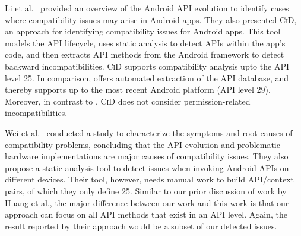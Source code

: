 Li et al.~\cite{lili2018cid} provided an overview of the
Android API evolution to identify cases where compatibility
issues may arise in Android apps. They also presented
\textsc{CiD}, an approach for identifying compatibility
issues for Android apps. This tool models the API lifecycle,
uses static analysis to detect APIs within the app's code,
and then extracts API methods from the Android framework to
detect backward incompatibilities.  \textsc{CiD} supports
compatibility analysis upto the API level 25.  In
comparison, \@approach offers automated extraction of the
API database, and thereby supports up to the most recent
Android platform (API level 29).  Moreover, in contrast to
\@approach, \textsc{CiD} does not consider permission-related incompatibilities.

Wei et al.~\cite{wei2016taming} conducted a study to
characterize the symptoms and root causes of compatibility
problems, concluding that the API evolution and problematic
hardware implementations are major causes of compatibility
issues. They also propose a static analysis tool to detect
issues when invoking Android APIs on different devices.
Their tool, however, needs manual work to build API/context
pairs, of which they only define 25. Similar to our prior
discussion of work by Huang et al., the major difference
between our work and this work is that our approach can
focus on all API methods that exist in an API level. Again,
the result reported by their approach would be a subset of
our detected issues.
